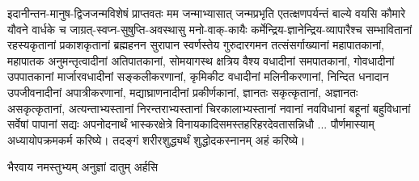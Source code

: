 इदानीन्तन-मानुष-द्विजजन्मविशेषं प्राप्तवतः मम जन्माभ्यासात् जन्मप्रभृति एतत्क्षणपर्यन्तं बाल्ये वयसि
कौमारे यौवने वार्धके च जाग्रत्-स्वप्न-सुषुप्ति-अवस्थासु मनो-वाक्-कायैः
कर्मेन्द्रिय-ज्ञानेन्द्रिय-व्यापारैश्च सम्भावितानां रहस्यकृतानां प्रकाशकृतानां ब्रह्महनन सुरापान
स्वर्णस्तेय गुरुदारगमन तत्संसर्गाख्यानां महापातकानां, महापातक अनुमन्तृत्वादीनां अतिपातकानां,
सोमयागस्थ क्षत्रिय वैश्य वधादीनां समपातकानां, गोवधादीनां उपपातकानां मार्जारवधादीनां सङ्कलीकरणानां,
कृमिकीट वधादीनां मलिनीकरणानां, निन्दित धनादान उपजीवनादीनां अपात्रीकरणानां, मद्याघ्राणनादीनां
प्रकीर्णकानां, ज्ञानतः सकृत्कृतानां, अज्ञानतः असकृत्कृतानां, अत्यन्ताभ्यस्तानां निरन्तराभ्यस्तानां
चिरकालाभ्यस्तानां नवानां नवविधानां बहूनां बहुविधानां सर्वेषां पापानां सद्यः अपनोदनार्थं
भास्करक्षेत्रे  विनायकादिसमस्तहरिहरदेवतासन्निधौ ... पौर्णमास्याम् अध्यायोपक्रमकर्म करिष्ये।  तदङ्गं
शरीरशुद्ध्यर्थं शुद्धोदकस्नानम् अहं करिष्ये।
    
{भैरवाय नमस्तुभ्यम् अनुज्ञां दातुम् अर्हसि}

    




